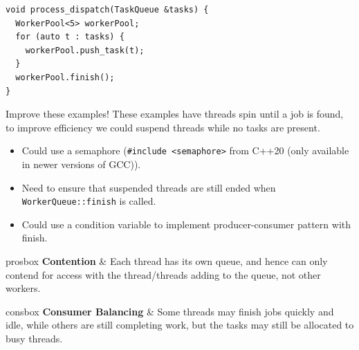 \begin{verbatim}
void process_dispatch(TaskQueue &tasks) {
  WorkerPool<5> workerPool;
  for (auto t : tasks) {
    workerPool.push_task(t);
  }
  workerPool.finish();
}
\end{verbatim}
\begin{sidenotebox}{Improve these examples!}
    These examples have threads spin until a job is found, to improve efficiency we could suspend threads while no tasks are present.
    \begin{itemize}
        \item Could use a semaphore (\texttt{#include <semaphore>} from C++20 (only available in newer versions of GCC)).
        \item Need to ensure that suspended threads are still ended when \texttt{WorkerQueue::finish} is called.
        \item Could use a condition variable to implement producer-consumer pattern with finish.
    \end{itemize}
\end{sidenotebox}

\begin{tabbox}{prosbox}
    \textbf{Contention} & Each thread has its own queue, and hence can only contend for access with the thread/threads adding to the queue, not other workers. \\
\end{tabbox}
\begin{tabbox}[.7\textwidth]{consbox}
    \textbf{Consumer Balancing} & Some threads may finish jobs quickly and idle, while others are still completing work, but the tasks may still be allocated to busy threads.
\end{tabbox}
